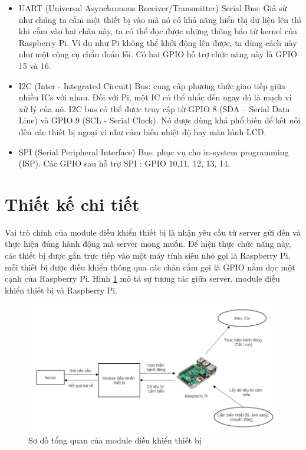 \documentclass[12pt,a4paper,oneside]{extbook}
\begin{document}
\begin{itemize}[topsep=1mm,itemsep=-0.5mm]
\item UART (Universal Asynchronous Receiver/Transmitter) Serial Bus: Giả sử như chúng ta cắm một thiết bị vào mà nó có khả năng hiển thị dữ liệu lên thì khi cắm vào hai chân này, ta có thể đọc được những thông báo từ kernel của Raspberry Pi. Ví dụ như Pi không thể khởi động lên được, ta dùng cách này như một công cụ chẩn đoán lỗi. Có hai GPIO hỗ trợ chức năng này là GPIO 15 và 16.

\item I2C (Inter - Integrated Circuit) Bus: cung cấp phương thức giao tiếp giữa nhiều ICs với nhau. Đối với Pi, một IC có thể nhắc đến ngay đó là mạch vi xử lý của nó. I2C bus có thể được truy cập từ GPIO 8 (SDA – Serial Data Line) và GPIO 9 (SCL - Serial Clock). Nó được dùng khá phổ biến để kết nối đến các thiết bị ngoại vi như cảm biến nhiệt độ hay màn hình LCD.

\item SPI (Serial Peripheral Interface) Bus: phục vụ cho in-system programming (ISP). Các GPIO sau hỗ trợ SPI : GPIO 10,11, 12, 13, 14.
\vspace{1mm}
\end{itemize}

\section{Thiết kế chi tiết}

Vai trò chính của module điều khiển thiết bị là nhận yêu cầu từ server gửi đến và thực hiện đúng hành động mà server mong muốn. Để hiện thực chức năng này, các thiết bị được gắn trực tiếp vào một máy tính siêu nhỏ gọi là Raspberry Pi, mỗi thiết bị được điều khiển thông qua các chân cắm gọi là GPIO nằm dọc một cạnh của Raspberry Pi. Hình \ref{fig:4-module-dieu-khien-overview} mô tả sự tương tác giữa server, module điều khiển thiết bị và Raspberry Pi.

\begin{figure}[h]
  \centering
     \includegraphics[scale=0.5]{4-module-dieu-khien-overview}
  \caption{Sơ đồ tổng quan của module điều khiển thiết bị}\label{fig:4-module-dieu-khien-overview}
\end{figure}
\end{document}
